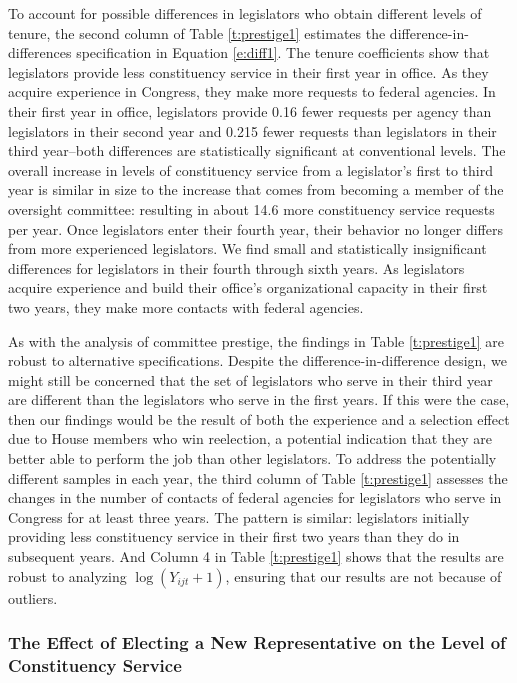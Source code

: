 \documentclass[12pt]{article}
\begin{document}
To account for possible differences in legislators who obtain different levels of tenure, the second column of Table \ref{t:prestige1} estimates the difference-in-differences specification in Equation \ref{e:diff1}. The tenure coefficients show that legislators provide less constituency service in their first year in office. As they acquire experience in Congress, they make more requests to federal agencies. In their first year in office, legislators provide 0.16 fewer requests per agency than legislators in their second year and 0.215 fewer requests than legislators in their third year--both differences are statistically significant at conventional levels. The overall increase in levels of constituency service from a legislator's first to third year is similar in size to the increase that comes from becoming a member of the oversight committee: resulting in about 14.6 more constituency service requests per year. Once legislators enter their fourth year, their behavior no longer differs from more experienced legislators. We find small and statistically insignificant differences for legislators in their fourth through sixth years. As legislators acquire experience and build their office's organizational capacity in their first two years, they make more contacts with federal agencies.  

As with the analysis of committee prestige, the findings in Table \ref{t:prestige1} are robust to alternative specifications. Despite the difference-in-difference design, we might still be concerned that the set of legislators who serve in their third year are different than the legislators who serve in the first years. If this were the case, then our findings would be the result of both the experience and a selection effect due to House members who win reelection, a potential indication that they are better able to perform the job than other legislators. To address the potentially different samples in each year, the third column of Table \ref{t:prestige1} assesses the changes in the number of contacts of federal agencies for legislators who serve in Congress for at least three years. The pattern is similar: legislators initially providing less constituency service in their first two years than they do in subsequent years. And Column 4 in Table \ref{t:prestige1} shows that the results are robust to analyzing $\log(Y_{ijt} + 1)$, ensuring that our results are not because of outliers.  

\subsubsection{The Effect of Electing a New Representative on the Level of Constituency Service}\label{s:tenure_dist}
\end{document}
